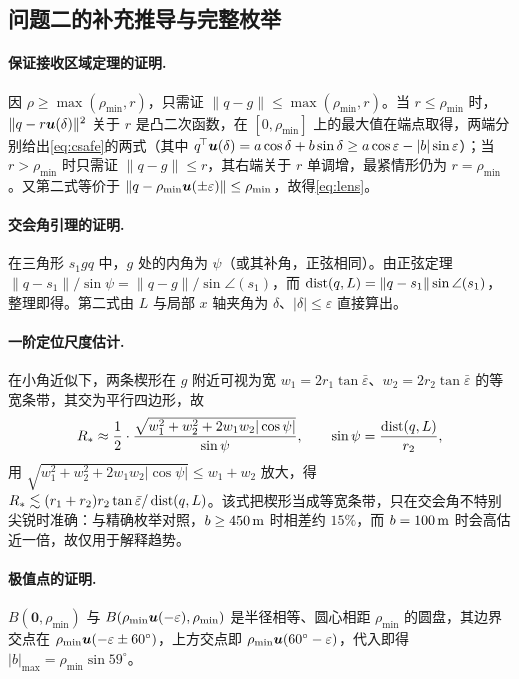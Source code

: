 \begin{appendices}
\section{问题二的补充推导与完整枚举}\label{app:q2}

\paragraph{保证接收区域定理的证明.} 因 $\rho\ge\max(\rho_{\min},r)$，只需证 $\|q-g\|\le\max(\rho_{\min},r)$。当 $r\le\rho_{\min}$ 时，$\|q-r\bm{u}(\delta)\|^2$ 关于 $r$ 是凸二次函数，在 $[0,\rho_{\min}]$ 上的最大值在端点取得，两端分别给出\cref{eq:csafe}的两式（其中 $q^{\!\top}\bm{u}(\delta)=a\cos\delta+b\sin\delta\ge a\cos\varepsilon-|b|\sin\varepsilon$）；当 $r>\rho_{\min}$ 时只需证 $\|q-g\|\le r$，其右端关于 $r$ 单调增，最紧情形仍为 $r=\rho_{\min}$。又第二式等价于 $\|q-\rho_{\min}\bm{u}(\pm\varepsilon)\|\le\rho_{\min}$，故得\cref{eq:lens}。

\paragraph{交会角引理的证明.} 在三角形 $s_1gq$ 中，$g$ 处的内角为 $\psi$（或其补角，正弦相同）。由正弦定理 $\|q-s_1\|/\sin\psi=\|q-g\|/\sin\angle(s_1)$，而 $\operatorname{dist}(q,L)=\|q-s_1\|\sin\angle(s_1)$，整理即得。第二式由 $L$ 与局部 $x$ 轴夹角为 $\delta$、$|\delta|\le\varepsilon$ 直接算出。

\paragraph{一阶定位尺度估计.} 在小角近似下，两条楔形在 $g$ 附近可视为宽 $w_1=2r_1\tan\bar\varepsilon$、$w_2=2r_2\tan\bar\varepsilon$ 的等宽条带，其交为平行四边形，故
\begin{equation}\label{eq:Rapprox-app}
  R_{*}\approx\frac{1}{2}\cdot\frac{\sqrt{w_1^2+w_2^2+2w_1w_2|\cos\psi|}}{\sin\psi},
  \qquad \sin\psi=\frac{\operatorname{dist}(q,L)}{r_2},
\end{equation}
用 $\sqrt{w_1^2+w_2^2+2w_1w_2|\cos\psi|}\le w_1+w_2$ 放大，得 $R_{*}\lesssim (r_1+r_2)r_2\tan\bar\varepsilon/\operatorname{dist}(q,L)$。该式把楔形当成等宽条带，只在交会角不特别尖锐时准确：与精确枚举对照，$b\ge450\,\mathrm{m}$ 时相差约 $15\%$，而 $b=100\,\mathrm{m}$ 时会高估近一倍，故仅用于解释趋势。

\paragraph{极值点的证明.} $B(\bm0,\rho_{\min})$ 与 $B(\rho_{\min}\bm{u}(-\varepsilon),\rho_{\min})$ 是半径相等、圆心相距 $\rho_{\min}$ 的圆盘，其边界交点在 $\rho_{\min}\bm{u}(-\varepsilon\pm60^\circ)$，上方交点即 $\rho_{\min}\bm{u}(60^\circ-\varepsilon)$，代入即得 $|b|_{\max}=\rho_{\min}\sin59^\circ$。


\end{appendices}
